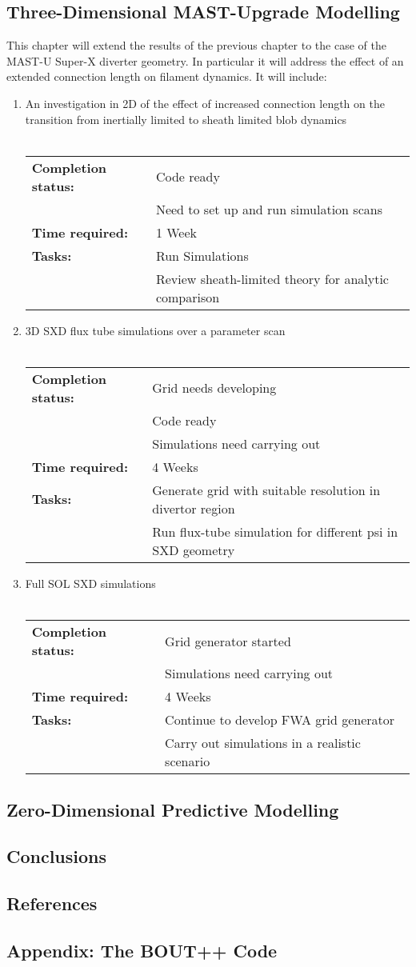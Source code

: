 \documentclass[11pt]{article}
\begin{document}
\subsection{Three-Dimensional MAST-Upgrade Modelling}
This chapter will extend the results of the previous chapter to the case of the MAST-U Super-X diverter geometry. In particular it will address the effect of an extended connection length on filament dynamics. It will include:
\begin{enumerate}
\item An investigation in 2D of the effect of increased connection length on the transition from inertially limited to sheath limited blob dynamics\\ \\
\begin{tabular}{l l}
\hline
\textbf{Completion status:} &  Code ready \\
 & Need to set up and run simulation scans \\
\hline
  \textbf{Time required:} & 1 Week \\
\hline
\textbf{Tasks:} & Run Simulations \\
 & Review sheath-limited theory for analytic comparison
\end{tabular}
\item 3D SXD flux tube simulations over a parameter scan\\ \\
\begin{tabular}{l l}
\hline
\textbf{Completion status:} & Grid needs developing  \\
 & Code ready \\
 & Simulations need carrying out\\
\hline
  \textbf{Time required:} & 4 Weeks \\
\hline
\textbf{Tasks:} & Generate grid with suitable resolution in divertor region \\
 & Run flux-tube simulation for different psi in SXD geometry
\end{tabular}
\item Full SOL SXD simulations\\ \\
\begin{tabular}{l l}
\hline
\textbf{Completion status:} & Grid generator started  \\
 & Simulations need carrying out\\
\hline
  \textbf{Time required:} & 4 Weeks \\
\hline
\textbf{Tasks:} &  Continue to develop FWA grid generator\\
 & Carry out simulations in a realistic scenario
\end{tabular}
\end{enumerate}
\subsection{Zero-Dimensional Predictive Modelling}
\subsection{Conclusions}
\subsection{References}
\subsection{Appendix: The BOUT++ Code}
\end{document}

